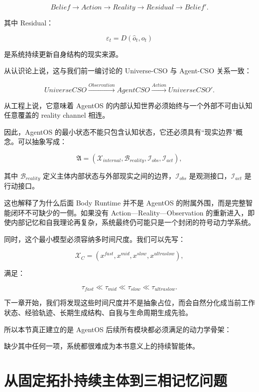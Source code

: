 \[
Belief
\rightarrow
Action
\rightarrow
Reality
\rightarrow
Residual
\rightarrow
Belief'.
\]

其中 Residual：

\[
\varepsilon_t
=
D(
\hat{o}_{t},
o_t
)
\]

是系统持续更新自身结构的现实来源。

从认识论上说，这与我们前一编讨论的 Universe-CSO 与 Agent-CSO 关系一致：

\[
UniverseCSO
\xrightarrow{Observation}
AgentCSO
\xrightarrow{Action}
UniverseCSO'.
\]

从工程上说，它意味着 AgentOS 的内部认知世界必须始终与一个外部不可由认知任意覆盖的 reality channel 相连。

因此，AgentOS 的最小状态不能只包含认知状态，它还必须具有“现实边界”概念。可以抽象写成：

\[
\mathfrak{A}
=
(
\mathcal{X}_{internal},
\mathcal{B}_{reality},
\mathcal{I}_{obs},
\mathcal{I}_{act}
),
\]

其中 $\mathcal{B}_{reality}$ 定义主体内部状态与外部现实之间的边界，$\mathcal{I}_{obs}$ 是观测接口，$\mathcal{I}_{act}$ 是行动接口。

这也解释了为什么后面 Body Runtime 并不是 AgentOS 的附属外围，而是完整智能闭环不可缺少的一侧。如果没有 Action—Reality—Observation 的重新进入，即使内部记忆和自我理论再复杂，系统最终仍可能只是一个封闭的符号动力学系统。

同时，这个最小模型必须容纳多时间尺度。我们可以先写：

\[
\mathcal{X}_C
=
\left(
x^{fast},
x^{mid},
x^{slow},
x^{ultraslow}
\right),
\]

满足：

\[
\tau_{fast}
\ll
\tau_{mid}
\ll
\tau_{slow}
\ll
\tau_{ultraslow}.
\]

下一章开始，我们将发现这些时间尺度并不是抽象占位，而会自然分化成当前工作状态、经验轨迹、长期生成结构、自我与生命周期生成先验。

所以本节真正建立的是 AgentOS 后续所有模块都必须满足的动力学骨架：

\begin{statementbox}
\centering
{}
\end{statementbox}

缺少其中任何一项，系统都很难成为本书意义上的持续智能体。


\section{从固定拓扑持续主体到三相记忆问题}

